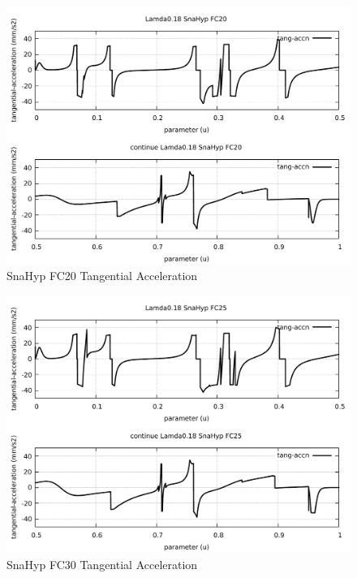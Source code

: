 \begin{figure}
	\caption     {SnaHyp FC20 Tangential Acceleration}
	\label{22-img-SnaHyp-FC20-Tangential-Acceleration.pdf}
\includegraphics[width=1.00\textwidth]{Chap4/appendix/app-SnaHyp/plots/22-img-SnaHyp-FC20-Tangential-Acceleration.pdf}
\end{figure}

\clearpage
\pagebreak

\begin{figure}
	\caption     {SnaHyp FC30 Tangential Acceleration}
	\label{23-img-SnaHyp-FC30-Tangential-Acceleration.pdf}
\includegraphics[width=1.00\textwidth]{Chap4/appendix/app-SnaHyp/plots/23-img-SnaHyp-FC30-Tangential-Acceleration.pdf}
\end{figure}


